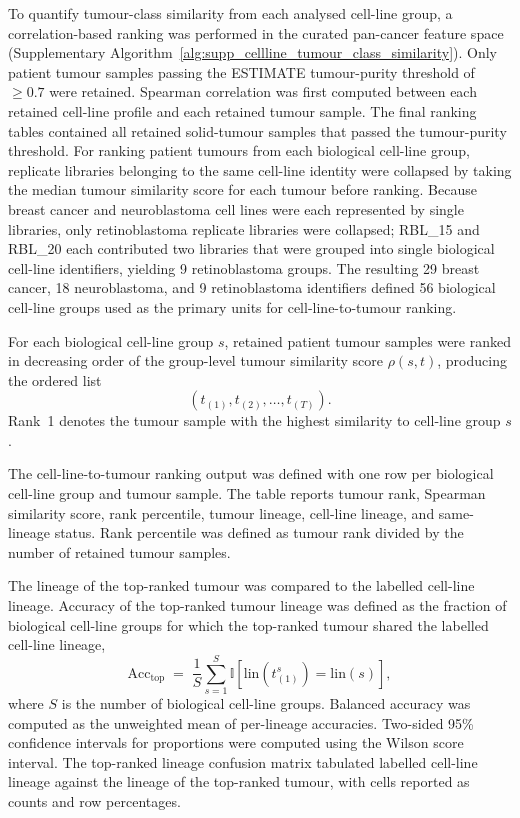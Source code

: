 To quantify tumour-class similarity from each analysed cell-line group, a
correlation-based ranking was performed in the curated pan-cancer feature space
(Supplementary Algorithm~\ref{alg:supp_cellline_tumour_class_similarity}).
Only patient tumour samples passing the ESTIMATE tumour-purity threshold of
\(\geq 0.7\) were retained. Spearman correlation was first computed between
each retained cell-line profile and each retained tumour sample. The final
ranking tables contained all retained solid-tumour samples that passed the
tumour-purity threshold. For ranking patient tumours from each biological
cell-line group, replicate libraries belonging to the same cell-line identity
were collapsed by taking the median tumour similarity score for each tumour
before ranking. Because breast cancer and neuroblastoma cell lines were each
represented by single libraries, only retinoblastoma replicate libraries were
collapsed; RBL\_15 and RBL\_20 each contributed two libraries that were grouped
into single biological cell-line identifiers, yielding 9 retinoblastoma groups.
The resulting 29 breast cancer, 18 neuroblastoma, and 9 retinoblastoma
identifiers defined 56 biological cell-line groups used as the primary units
for cell-line-to-tumour ranking.

For each biological cell-line group \(s\), retained patient tumour samples were
ranked in decreasing order of the group-level tumour similarity score
\(\rho(s,t)\), producing the ordered list
\[
\left( t_{(1)}, t_{(2)}, \ldots, t_{(T)} \right).
\]
Rank~1 denotes the tumour sample with the highest similarity to cell-line group
\(s\).

The cell-line-to-tumour ranking output was defined with one row per biological
cell-line group and tumour sample. The table reports tumour rank,
Spearman similarity score, rank percentile, tumour lineage, cell-line
lineage, and same-lineage status. Rank percentile was defined as tumour rank
divided by the number of retained tumour samples.

The lineage of the top-ranked tumour was compared to the labelled cell-line
lineage. Accuracy of the top-ranked tumour lineage was defined as the fraction
of biological cell-line groups for which the top-ranked tumour shared the
labelled cell-line lineage,
\[
\mathrm{Acc}_{\mathrm{top}} \;=\; \frac{1}{S}\sum_{s=1}^{S} \mathbb{I}\!\left[\mathrm{lin}\!\left(t_{(1)}^{s}\right)=\mathrm{lin}(s)\right],
\]
where \(S\) is the number of biological cell-line groups. Balanced accuracy was computed
as the unweighted mean of per-lineage accuracies. Two-sided 95\% confidence
intervals for proportions were computed using the Wilson score interval.
The top-ranked lineage confusion matrix tabulated labelled cell-line lineage
against the lineage of the top-ranked tumour, with cells reported as counts and
row percentages.

